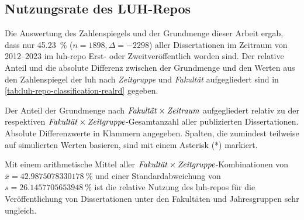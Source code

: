 \subsection{Nutzungsrate des LUH-Repos}\label{sec:luh-repo-results-zahlenspiegel}
Die Auswertung des Zahlenspiegels und der Grundmenge dieser Arbeit ergab, dass nur \SI[round-mode=places,round-precision=2]{45,23}{\percent} ($n=\num{1898},\Delta=\num{-2298}$) aller Dissertationen im Zeitraum von 2012--2023 im \gls{luh-repo} Erst- oder Zweitveröffentlich worden sind.
Der relative Anteil und die absolute Differenz zwischen der Grundmenge und den Werten aus den Zahlenspiegel der \gls{luh} nach \textit{Zeitgruppe} und \textit{Fakultät} aufgegliedert sind in \cref{tab:luh-repo-classification-realrd} gegeben.
\begin{table}[!htbp]
	\caption{Der Anteil der Grundmenge nach $\text{\textit{Fakultät}}\times\text{\textit{Zeitraum}}$ aufgegliedert relativ zu der respektiven $\text{\textit{Fakultät}}\times\text{\textit{Zeitgruppe}}$-Gesamtanzahl aller publizierten Dissertationen.
    Absolute Differenzwerte in Klammern angegeben.
    Spalten, die zumindest teilweise auf simulierten Werten basieren, sind mit einem Asterisk (*) markiert.}
    
    \label{tab:luh-repo-zahlenspiegel-relative-grundmenge}
\end{table}
Mit einem arithmetische Mittel aller $\text{\textit{Fakultät}}\times\text{\textit{Zeitgruppe}}$-Kombinationen von $\bar{x}=\SI[round-mode=places,round-precision=2]{42.9875078330178}{\percent}$ und einer Standardabweichung von $s=\SI[round-mode=places,round-precision=2]{26.1457705653948}{\percent}$ ist die relative Nutzung des \gls{luh-repo}s für die Veröffentlichung von Dissertationen unter den Fakultäten und Jahresgruppen sehr ungleich.

